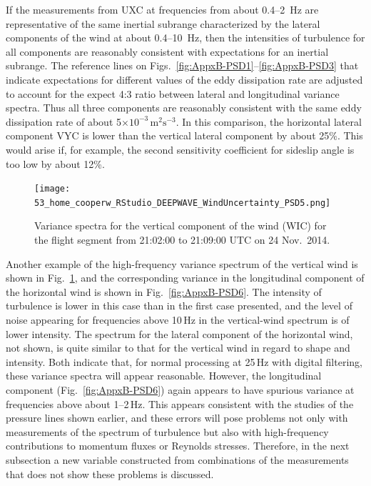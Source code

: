 \documentclass[12pt,twoside,english]{article}\usepackage[]{graphicx}\usepackage[]{color}
\let\OrgIndex\index
\renewcommand*{\index}[1]{\OrgIndex{#1}}
\begin{document}
If the measurements from UXC at frequencies from about 0.4--2~Hz are representative of the same inertial subrange characterized by the lateral components of the wind at about 0.4--10~Hz, then the intensities of turbulence for all components are reasonably consistent with expectations for an inertial subrange. The reference lines on Figs.~\ref{fig:AppxB-PSD1}--\ref{fig:AppxB-PSD3} that indicate expectations for different values of the eddy dissipation rate are adjusted to account for the expect 4:3 ratio between lateral and longitudinal variance spectra. Thus all three components are reasonably consistent with the same eddy dissipation rate of about 5$\times10^{-3}\,\mathrm{m}^{2}\mathrm{s}^{-3}$. In this comparison, the horizontal lateral component VYC is lower than the vertical lateral component by about 25\%. This would arise if, for example, the second sensitivity coefficient for sideslip angle is too low by about 12\%. 





\begin{figure}
\noindent \begin{centering}
\texttt{[image: 53\_home\_cooperw\_RStudio\_DEEPWAVE\_WindUncertainty\_PSD5.png]}  
\par\end{centering}

\protect\protect\protect\caption{\label{fig:AppxB-PSD5}Variance spectra for the vertical component of the wind (WIC) for the flight segment from 21:02:00 to 21:09:00 UTC on 24 Nov.\ 2014.} 
\end{figure}

Another example of the high-frequency variance spectrum of the vertical wind is shown in Fig.~\ref{fig:AppxB-PSD5}, and the corresponding variance in the longitudinal component of the horizontal wind is shown in Fig.~\ref{fig:AppxB-PSD6}. The intensity of turbulence is lower in this case than in the first case presented, and the level of noise appearing for frequencies above 10\,Hz in the vertical-wind spectrum is of lower intensity. The spectrum for the lateral component of the horizontal wind, not shown, is quite similar to that for the vertical wind in regard to shape and intensity. Both indicate that, for normal processing at 25\,Hz with digital filtering, these variance spectra will appear reasonable. However, the longitudinal component (Fig.~\ref{fig:AppxB-PSD6}) again appears to have spurious variance at frequencies above about 1--2\,Hz. This appears consistent with the studies of the pressure lines shown earlier, and these errors will pose problems not only with measurements of the spectrum of turbulence but also with high-frequency contributions to momentum fluxes or Reynolds stresses. Therefore, in the next subsection a new variable constructed from combinations of the measurements that does not show these problems is discussed. 
\end{document}
